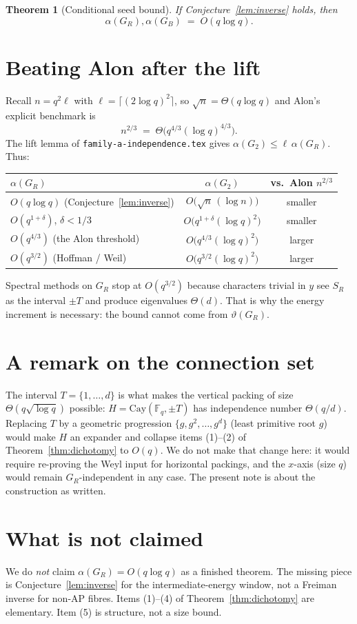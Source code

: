 \documentclass[11pt]{article}
\newtheorem{theorem}{Theorem}
\theoremstyle{definition}
\newcommand{\F}{\mathbb{F}}
\begin{document}
\begin{theorem}[Conditional seed bound]\label{thm:seed}
If Conjecture~\ref{lem:inverse} holds, then
\[
  \alpha(G_R),\alpha(G_B)\;=\;O(q\log q).
\]
\end{theorem}

\section{Beating Alon after the lift}\label{sec:alon}

Recall $n=q^{2}\ell$ with $\ell=\lceil(2\log q)^{2}\rceil$, so $\sqrt{n}=\Theta(q\log q)$ and Alon's explicit benchmark is
\[
  n^{2/3}\;=\;\Theta\bigl(q^{4/3}(\log q)^{4/3}\bigr).
\]
The lift lemma of \texttt{family-a-independence.tex} gives $\alpha(G_2)\le\ell\,\alpha(G_R)$.
Thus:
\begin{center}
\begin{tabular}{lcc}
\hline
$\alpha(G_R)$ & $\alpha(G_2)$ & vs.\ Alon $n^{2/3}$ \\
\hline
$O(q\log q)$ (Conjecture~\ref{lem:inverse}) & $O\bigl(\sqrt{n}\,(\log n)\bigr)$ & smaller \\
$O(q^{1+\delta})$, $\delta<1/3$ & $O\bigl(q^{1+\delta}(\log q)^{2}\bigr)$ & smaller \\
$O(q^{4/3})$ (the Alon threshold) & $O\bigl(q^{4/3}(\log q)^{2}\bigr)$ & larger \\
$O(q^{3/2})$ (Hoffman / Weil) & $O\bigl(q^{3/2}(\log q)^{2}\bigr)$ & larger \\
\hline
\end{tabular}
\end{center}
Spectral methods on $G_R$ stop at $O(q^{3/2})$ because characters trivial in $y$ see $S_R$ as the interval $\pm T$ and produce eigenvalues $\Theta(d)$.
That is why the energy increment is necessary: the bound cannot come from $\vartheta(G_R)$.

\section{A remark on the connection set}

The interval $T=\{1,\dots,d\}$ is what makes the vertical packing of size $\Theta(q\sqrt{\log q})$ possible: $H=\mathrm{Cay}(\F_q,\pm T)$ has independence number $\Theta(q/d)$.
Replacing $T$ by a geometric progression $\{g,g^{2},\dots,g^{d}\}$ (least primitive root $g$) would make $H$ an expander and collapse items (1)--(2) of Theorem~\ref{thm:dichotomy} to $O(q)$.
We do not make that change here: it would require re-proving the Weyl input for horizontal packings, and the $x$-axis (size $q$) would remain $G_R$-independent in any case.
The present note is about the construction as written.

\section{What is not claimed}

We do \emph{not} claim $\alpha(G_R)=O(q\log q)$ as a finished theorem.
The missing piece is Conjecture~\ref{lem:inverse} for the intermediate-energy window, not a Freiman inverse for non-AP fibres.
Items (1)--(4) of Theorem~\ref{thm:dichotomy} are elementary.
Item (5) is structure, not a size bound.
\end{document}
